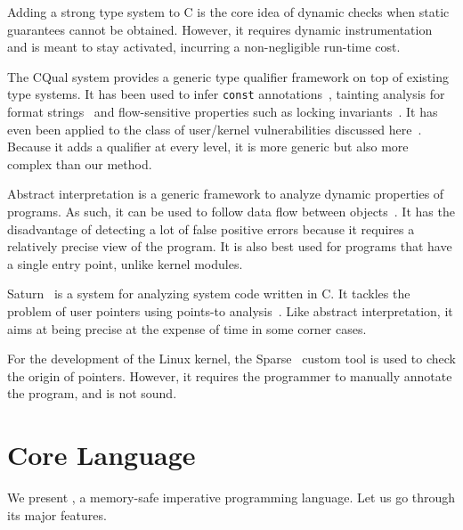 Adding a strong type system to C is the core idea of
dynamic checks when static guarantees cannot be obtained. However, it requires
dynamic instrumentation and is meant to stay activated, incurring a
non-negligible run-time cost.

The CQual system\cite{toplas-quals} provides a generic type qualifier framework
on top of existing type systems. It has been used to infer \texttt{const}
annotations~\cite{pldi99}, tainting analysis for format strings~\cite{usenix01}
and flow-sensitive properties such as locking invariants~\cite{pldi02}. It has even been applied to
the class of user/kernel vulnerabilities discussed here~\cite{cquk-usenix04}.
Because it adds a qualifier at every level, it is more generic but also more
complex than our method.

Abstract interpretation is a generic framework to analyze
dynamic properties of programs. As such, it can be used to follow data
flow between objects~\cite{liang2012taint}. It has the disadvantage of detecting
a lot of false positive errors because it requires a relatively precise view of
the program. It is also best used for programs that have a single entry point,
unlike kernel modules.

Saturn~\cite{paste07} is a system for analyzing system code written in C. It
tackles the problem of user pointers using points-to analysis~\cite{oakland08}.
Like abstract interpretation, it aims at being precise at the expense of time in
some corner cases.

For the development of the Linux kernel, the Sparse~\cite{TorvaldsSparse} custom
tool is used to check the origin of pointers. However, it requires the
programmer to manually annotate the program, and is not sound.

\section{Core Language}
\label{sec:lang}

We present \langname, a memory-safe imperative programming language. Let us go
through its major features.

